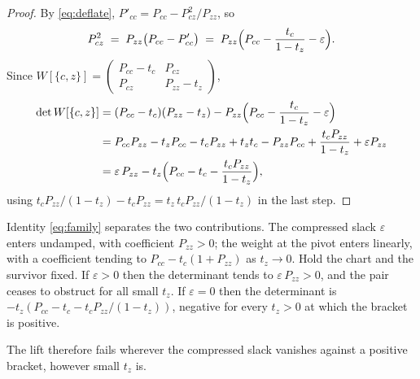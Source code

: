 \begin{proof}
By \eqref{eq:deflate}, $P'_{cc}=P_{cc}-P_{cz}^{2}/P_{zz}$, so
\[
  P_{cz}^{2}\;=\;P_{zz}\bigl(P_{cc}-P'_{cc}\bigr)
  \;=\;P_{zz}\Bigl(P_{cc}-\frac{t_c}{1-t_z}-\varepsilon\Bigr).
\]
Since $W[\{c,z\}]=
\left(\begin{smallmatrix}P_{cc}-t_c&P_{cz}\\P_{cz}&P_{zz}-t_z\end{smallmatrix}\right)$,
\begin{align*}
  \det W[\{c,z\}]
  &=(P_{cc}-t_c)(P_{zz}-t_z)
     -P_{zz}\Bigl(P_{cc}-\frac{t_c}{1-t_z}-\varepsilon\Bigr)\\
  &=P_{cc}P_{zz}-t_zP_{cc}-t_cP_{zz}+t_zt_c
     -P_{zz}P_{cc}+\frac{t_cP_{zz}}{1-t_z}+\varepsilon P_{zz}\\
  &=\varepsilon\,P_{zz}-t_z\Bigl(P_{cc}-t_c-\frac{t_cP_{zz}}{1-t_z}\Bigr),
\end{align*}
using $t_cP_{zz}/(1-t_z)-t_cP_{zz}=t_z\,t_cP_{zz}/(1-t_z)$ in the last
step.
\end{proof}

Identity \eqref{eq:family} separates the two contributions.
The compressed slack $\varepsilon$ enters undamped, with coefficient $P_{zz}>0$;
the weight at the pivot enters linearly, with a coefficient tending to
$P_{cc}-t_c(1+P_{zz})$ as $t_z\to0$.  Hold the chart and the survivor
fixed.  If $\varepsilon>0$ then the determinant tends to
$\varepsilon\,P_{zz}>0$, and the pair ceases to obstruct for all small
$t_z$.  If $\varepsilon=0$ then the determinant is
$-t_z(P_{cc}-t_c-t_cP_{zz}/(1-t_z))$, negative for every $t_z>0$ at which
the bracket is positive.

The lift therefore fails wherever the compressed slack vanishes against
a positive bracket, however small $t_z$ is.

